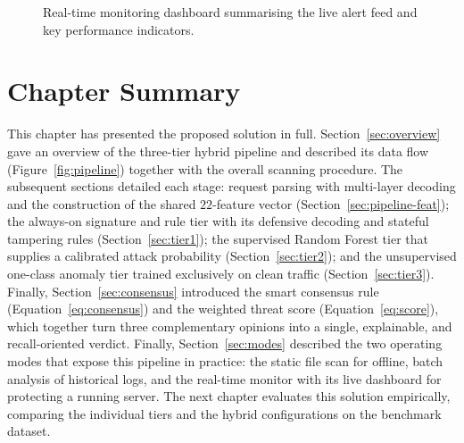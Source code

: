 \documentclass[12pt,a4paper]{report}
\begin{document}
\begin{figure}[ht]
  \centering
  \caption{Real-time monitoring dashboard summarising the live alert feed and
           key performance indicators.}
  \label{fig:dashboard}
\end{figure}

\section{Chapter Summary}
\label{sec:ch3summary}

This chapter has presented the proposed solution in full. Section~\ref{sec:overview}
gave an overview of the three-tier hybrid pipeline and described its data
flow (Figure~\ref{fig:pipeline}) together with the overall scanning
procedure. The subsequent sections detailed each stage: request parsing with
multi-layer decoding and the construction of the shared $22$-feature vector
(Section~\ref{sec:pipeline-feat}); the always-on signature and rule tier with
its defensive decoding and stateful tampering rules (Section~\ref{sec:tier1});
the supervised Random Forest tier that supplies a calibrated attack
probability (Section~\ref{sec:tier2}); and the unsupervised one-class anomaly
tier trained exclusively on clean traffic (Section~\ref{sec:tier3}). Finally,
Section~\ref{sec:consensus} introduced the smart consensus rule
(Equation~\eqref{eq:consensus}) and the weighted threat score
(Equation~\eqref{eq:score}), which together turn three complementary opinions
into a single, explainable, and recall-oriented verdict. Finally,
Section~\ref{sec:modes} described the two operating modes that expose this
pipeline in practice: the static file scan for offline, batch analysis of
historical logs, and the real-time monitor with its live dashboard for
protecting a running server. The next chapter evaluates this solution
empirically, comparing the individual tiers and the hybrid configurations on
the benchmark dataset.

\end{document}
